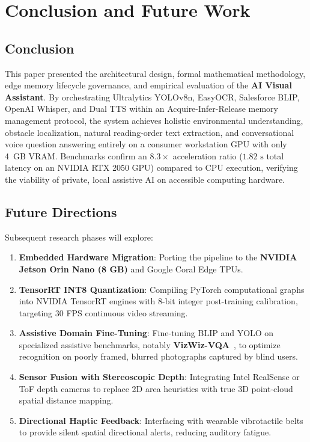 \documentclass[conference]{IEEEtran}
\begin{document}
\section{Conclusion and Future Work}

\subsection{Conclusion}
This paper presented the architectural design, formal mathematical methodology, edge memory lifecycle governance, and empirical evaluation of the \textbf{AI Visual Assistant}. By orchestrating Ultralytics YOLOv8n, EasyOCR, Salesforce BLIP, OpenAI Whisper, and Dual TTS within an Acquire-Infer-Release memory management protocol, the system achieves holistic environmental understanding, obstacle localization, natural reading-order text extraction, and conversational voice question answering entirely on a consumer workstation GPU with only 4~GB VRAM. Benchmarks confirm an $8.3\times$ acceleration ratio ($1.82\text{ s}$ total latency on an NVIDIA RTX 2050 GPU) compared to CPU execution, verifying the viability of private, local assistive AI on accessible computing hardware.

\subsection{Future Directions}
Subsequent research phases will explore:
\begin{enumerate}
    \item \textbf{Embedded Hardware Migration}: Porting the pipeline to the \textbf{NVIDIA Jetson Orin Nano (8 GB)} and Google Coral Edge TPUs.
    \item \textbf{TensorRT INT8 Quantization}: Compiling PyTorch computational graphs into NVIDIA TensorRT engines with 8-bit integer post-training calibration, targeting 30 FPS continuous video streaming.
    \item \textbf{Assistive Domain Fine-Tuning}: Fine-tuning BLIP and YOLO on specialized assistive benchmarks, notably \textbf{VizWiz-VQA}~\cite{ref:vizwiz}, to optimize recognition on poorly framed, blurred photographs captured by blind users.
    \item \textbf{Sensor Fusion with Stereoscopic Depth}: Integrating Intel RealSense or ToF depth cameras to replace 2D area heuristics with true 3D point-cloud spatial distance mapping.
    \item \textbf{Directional Haptic Feedback}: Interfacing with wearable vibrotactile belts to provide silent spatial directional alerts, reducing auditory fatigue.
\end{enumerate}
\end{document}

